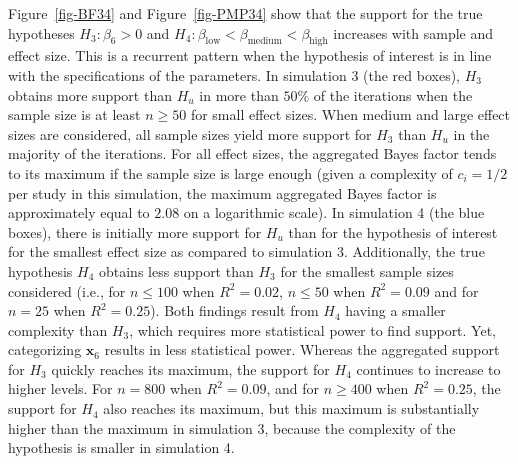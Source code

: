 \documentclass[
]{interact}
\begin{document}
                    Figure~\ref{fig-BF34} and Figure~\ref{fig-PMP34} show that the support
                    for the true hypotheses \(H_3:\beta_6>0\) and
                    \(H_4: \beta_{\text{low}} < \beta_{\text{medium}} < \beta_{\text{high}}\)
                    increases with sample and effect size. This is a recurrent pattern when
                    the hypothesis of interest is in line with the specifications of the
                    parameters. In simulation 3 (the red boxes), \(H_3\) obtains more
                    support than \(H_u\) in more than \(50\%\) of the iterations when the
                    sample size is at least \(n \geq 50\) for small effect sizes. When
                    medium and large effect sizes are considered, all sample sizes yield
                    more support for \(H_3\) than \(H_u\) in the majority of the iterations.
                    For all effect sizes, the aggregated Bayes factor tends to its maximum
                    if the sample size is large enough (given a complexity of \(c_i = 1/2\)
                                                        per study in this simulation, the maximum aggregated Bayes factor is
                                                        approximately equal to \(2.08\) on a logarithmic scale). In simulation 4
                    (the blue boxes), there is initially more support for \(H_u\) than for
                    the hypothesis of interest for the smallest effect size as compared to
                    simulation 3. Additionally, the true hypothesis \(H_4\) obtains less
                    support than \(H_3\) for the smallest sample sizes considered (i.e., for
                                                                                   \(n \leq 100\) when \(R^2 = 0.02\), \(n \leq 50\) when \(R^2 = 0.09\)
                                                                                   and for \(n = 25\) when \(R^2 = 0.25\)). Both findings result from
                    \(H_4\) having a smaller complexity than \(H_3\), which requires more
                    statistical power to find support. Yet, categorizing
                    \(\boldsymbol{x}_6\) results in less statistical power. Whereas the
                    aggregated support for \(H_3\) quickly reaches its maximum, the support
                    for \(H_4\) continues to increase to higher levels. For \(n = 800\) when
                    \(R^2 = 0.09\), and for \(n \geq 400\) when \(R^2 = 0.25\), the support
                    for \(H_4\) also reaches its maximum, but this maximum is substantially
                    higher than the maximum in simulation 3, because the complexity of the
                    hypothesis is smaller in simulation 4.
                    
\end{document}
